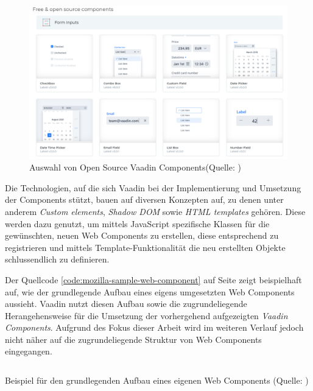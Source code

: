 \documentclass[a4paper,12pt,twoside]{scrreprt}
\begin{document}
\begin{figure}[ht]
    \centering
    \includegraphics[scale=0.38]{images/Vaadin_Components-overview.png}
    \caption[Auswahl von Open Source Vaadin Components]{Auswahl von Open Source Vaadin Components\newline(Quelle: \cite[][]{vaadin_ltd_mobile_nodate})}
    \label{fig:vaadin-components-overview}
\end{figure}

Die Technologien, auf die sich Vaadin bei der Implementierung und Umsetzung der Components stützt, bauen auf diversen Konzepten auf, zu denen unter anderem \textit{Custom elements}, \textit{Shadow \ac{DOM}} sowie \textit{HTML templates} gehören. Diese werden dazu genutzt, um mittels JavaScript spezifische Klassen für die gewünschten, neuen Web Components zu erstellen, diese entsprechend zu registrieren und mittels Template-Funktionalität die neu erstellten Objekte schlussendlich zu definieren. \parencite[][]{mozilla_contributors_web_2021}

\medskip

Der Quellcode \ref{code:mozilla-sample-web-component} auf Seite \pageref{code:mozilla-sample-web-component} zeigt beispielhaft auf, wie der grundlegende Aufbau eines eigens umgesetzten Web Components aussieht. Vaadin nutzt diesen Aufbau sowie die zugrundeliegende Herangehensweise für die Umsetzung der vorhergehend aufgezeigten \textit{Vaadin Components}. \parencite[vgl.][]{vaadin_ltd_vaadin-text-fieldjs_2021} Aufgrund des Fokus dieser Arbeit wird im weiteren Verlauf jedoch nicht näher auf die zugrundeliegende Struktur von Web Components eingegangen.

\begin{listing}[ht]
    \inputminted[fontsize=\footnotesize,linenos]{js}{code/Mozilla_Web-Component-sample.js}
    \caption[Beispiel für den grundlegenden Aufbau eines eigenen Web Components]{Beispiel für den grundlegenden Aufbau eines eigenen Web Components (Quelle: \cite[][]{mozilla_contributors_using_2021})}
    \label{code:mozilla-sample-web-component}
\end{listing}
\end{document}
